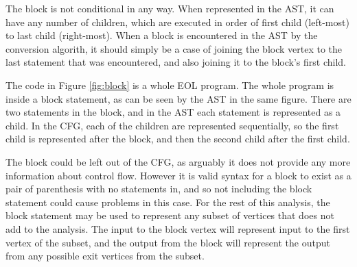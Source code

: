 The block is not conditional in any way. When represented in the AST, it can have any number of children, which are executed in order of first child (left-most) to last child (right-most). When a block is encountered in the AST by the conversion algorith, it should simply be a case of joining the block vertex to the last statement that was encountered, and also joining it to the block's first child.

The code in Figure \ref{fig:block} is a whole EOL program. The whole program is inside a block statement, as can be seen by the AST in the same figure. There are two statements in the block, and in the AST each statement is represented as a child. In the CFG, each of the children are represented sequentially, so the first child is represented after the block, and then the second child after the first child.

The block could be left out of the CFG, as arguably it does not provide any more information about control flow. However it is valid syntax for a block to exist as a pair of parenthesis with no statements in, and so not including the block statement could cause problems in this case. For the rest of this analysis, the block statement may be used to represent any subset of vertices that does not add to the analysis. The input to the block vertex will represent input to the first vertex of the subset, and the output from the block will represent the output from any possible exit vertices from the subset.

